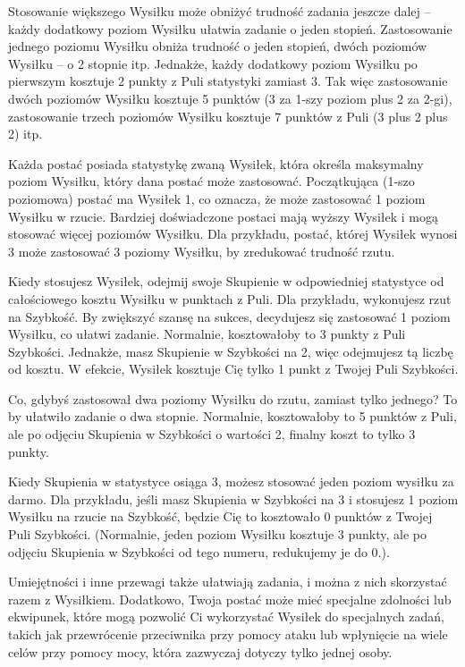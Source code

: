 Stosowanie większego Wysiłku może obniżyć trudność zadania jeszcze dalej – każdy dodatkowy poziom Wysiłku ułatwia zadanie o jeden stopień. Zastosowanie jednego poziomu Wysiłku obniża trudność o jeden stopień, dwóch poziomów Wysiłku – o 2 stopnie itp. Jednakże, każdy dodatkowy poziom Wysiłku po pierwszym kosztuje 2 punkty z Puli statystyki zamiast 3. Tak więc zastosowanie dwóch poziomów Wysiłku kosztuje 5 punktów (3 za 1-szy poziom plus 2 za 2-gi), zastosowanie trzech poziomów Wysiłku kosztuje 7 punktów z Puli (3 plus 2 plus 2) itp.

Każda postać posiada statystykę zwaną Wysiłek, która określa maksymalny poziom Wysiłku, który dana postać może zastosować. Początkująca (1-szo poziomowa) postać ma Wysiłek 1, co oznacza, że może zastosować 1 poziom Wysiłku w rzucie. Bardziej doświadczone postaci mają wyższy Wysiłek i mogą stosować więcej poziomów Wysiłku. Dla przykładu, postać, której Wysiłek wynosi 3 może zastosować 3 poziomy Wysiłku, by zredukować trudność rzutu.

Kiedy stosujesz Wysiłek, odejmij swoje Skupienie w odpowiedniej statystyce od całościowego kosztu Wysiłku w punktach z Puli. Dla przykładu, wykonujesz rzut na Szybkość. By zwiększyć szansę na sukces, decydujesz się zastosować 1 poziom Wysiłku, co ułatwi zadanie. Normalnie, kosztowałoby to 3 punkty z Puli Szybkości. Jednakże, masz Skupienie w Szybkości na 2, więc odejmujesz tą liczbę od kosztu. W efekcie, Wysiłek kosztuje Cię tylko 1 punkt z Twojej Puli Szybkości.

Co, gdybyś zastosował dwa poziomy Wysiłku do rzutu, zamiast tylko jednego? To by ułatwiło zadanie o dwa stopnie. Normalnie, kosztowałoby to 5 punktów z Puli, ale po odjęciu Skupienia w Szybkości o wartości 2, finalny koszt to tylko 3 punkty.

Kiedy Skupienia w statystyce osiąga 3, możesz stosować jeden poziom wysiłku za darmo. Dla przykładu, jeśli masz Skupienia w Szybkości na 3 i stosujesz 1 poziom Wysiłku na rzucie na Szybkość, będzie Cię to kosztowało 0 punktów z Twojej Puli Szybkości. (Normalnie, jeden poziom Wysiłku kosztuje 3 punkty, ale po odjęciu Skupienia w Szybkości od tego numeru, redukujemy je do 0.).

Umiejętności i inne przewagi także ułatwiają zadania, i można z nich skorzystać razem z Wysiłkiem. Dodatkowo, Twoja postać może mieć specjalne zdolności lub ekwipunek, które mogą pozwolić Ci wykorzystać Wysiłek do specjalnych zadań, takich jak przewrócenie przeciwnika przy pomocy ataku lub wpłynięcie na wiele celów przy pomocy mocy, która zazwyczaj dotyczy tylko jednej osoby.


